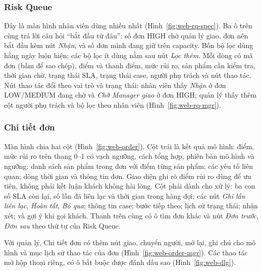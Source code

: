 \subsubsection{Risk Queue}

Đây là màn hình nhân viên dùng nhiều nhất (Hình~\ref{fig:web-rq-spec}). Ba ô trên cùng trả lời câu hỏi
``bắt đầu từ đâu'': số đơn HIGH chờ quản lý giao, đơn nên bắt đầu kèm nút \textit{Nhận}, và số đơn
mình đang giữ trên capacity. Bốn bộ lọc dùng hằng ngày luôn hiện; các bộ lọc ít dùng nằm sau nút
\textit{Lọc thêm}. Mỗi dòng có mã đơn (bấm để sao chép), điểm và thanh điểm, mức rủi ro, sản phẩm cần
kiểm tra, thời gian chờ, trạng thái SLA, trạng thái case, người phụ trách và nút thao tác. Nút thao
tác đổi theo vai trò và trạng thái: nhân viên thấy \textit{Nhận} ở đơn LOW/MEDIUM đang chờ và
\textit{Chờ Manager giao} ở đơn HIGH; quản lý thấy thêm cột người phụ trách và bộ lọc theo nhân viên
(Hình~\ref{fig:web-rq-mgr}).


\subsubsection{Chi tiết đơn}

Màn hình chia hai cột (Hình~\ref{fig:web-order}). Cột trái là kết quả mô hình: điểm, mức rủi ro trên
thang 0--1 có vạch ngưỡng, cách tổng hợp, phiên bản mô hình và ngưỡng; danh sách sản phẩm trong đơn
với điểm từng sản phẩm; các yếu tố liên quan; dòng thời gian và thông tin đơn. Giao diện ghi rõ điểm
rủi ro dùng để ưu tiên, không phải kết luận khách không hài lòng. Cột phải dành cho xử lý: ba con số
SLA còn lại, số lần đã liên lạc và thời gian trong hàng đợi; các nút \textit{Ghi lần liên lạc},
\textit{Hoàn tất}, \textit{Bỏ qua}; thông tin case; bước tiếp theo; lịch sử trạng thái; nhận xét; và
gợi ý khi gọi khách. Thanh trên cùng có ô tìm đơn khác và nút \textit{Đơn trước}, \textit{Đơn sau} theo
thứ tự của Risk Queue.


Với quản lý, Chi tiết đơn có thêm nút giao, chuyển người, mở lại, ghi chú cho mô hình và mục lịch sử
thao tác của đơn (Hình~\ref{fig:web-order-mgr}). Các thao tác mở hộp thoại riêng, có ô bắt buộc được
đánh dấu sao (Hình~\ref{fig:web-dlg}).


